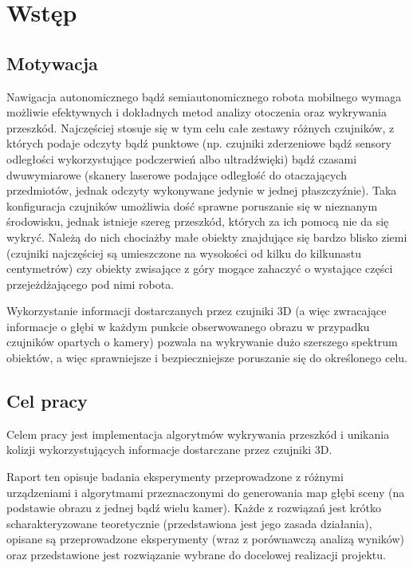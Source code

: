 
\section{Wstęp}

\subsection{Motywacja}

Nawigacja autonomicznego bądź semiautonomicznego robota mobilnego wymaga możliwie
efektywnych i dokładnych metod analizy otoczenia oraz wykrywania przeszkód.
Najczęściej stosuje się w tym celu całe zestawy różnych czujników, z których
podaje odczyty bądź punktowe (np. czujniki zderzeniowe bądź sensory odległości
wykorzystujące podczerwień albo ultradźwięki) bądź czasami dwuwymiarowe (skanery
laserowe podające odległość do otaczających przedmiotów, jednak odczyty wykonywane
jedynie w jednej płaszczyźnie). Taka konfiguracja czujników umożliwia dość sprawne
poruszanie się w nieznanym środowisku, jednak istnieje szereg przeszkód, których za
ich pomocą nie da się wykryć. Należą do nich chociażby małe obiekty znajdujące
się bardzo blisko ziemi (czujniki najczęściej są umieszczone na wysokości od kilku
do kilkunastu centymetrów) czy obiekty zwisające z góry mogące zahaczyć o wystające
części przejeżdżającego pod nimi robota.

Wykorzystanie informacji dostarczanych przez czujniki 3D (a więc zwracające informacje
o głębi w każdym punkcie obserwowanego obrazu w przypadku czujników opartych o kamery)
pozwala na wykrywanie dużo szerszego spektrum obiektów, a więc sprawniejsze i bezpieczniejsze
poruszanie się do określonego celu.

\subsection{Cel pracy}

Celem pracy jest implementacja algorytmów wykrywania przeszkód i unikania kolizji
wykorzystujących informacje dostarczane przez czujniki 3D.

Raport ten opisuje badania eksperymenty przeprowadzone z różnymi urządzeniami
i algorytmami przeznaczonymi do generowania map głębi sceny (na podstawie obrazu
z jednej bądź wielu kamer). Każde z rozwiązań jest krótko scharakteryzowane teoretycznie
(przedstawiona jest jego zasada działania), opisane są przeprowadzone eksperymenty
(wraz z porównawczą analizą wyników) oraz przedstawione jest rozwiązanie wybrane
do docelowej realizacji projektu.
